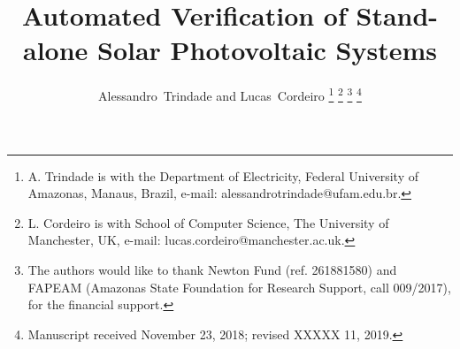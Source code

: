 \documentclass[journal]{IEEEtran}
\begin{document}
%
\title{Automated Verification of Stand-alone Solar Photovoltaic Systems}
%
%
%

\author{Alessandro~Trindade and Lucas~Cordeiro%
\thanks{A. Trindade is with the Department of Electricity, Federal University of Amazonas, Manaus, Brazil, e-mail: alessandrotrindade@ufam.edu.br.}%
\thanks{L. Cordeiro is with School of Computer Science, The University of Manchester, UK, e-mail: lucas.cordeiro@manchester.ac.uk.}%
\thanks{The authors would like to thank Newton Fund (ref. 261881580) and FAPEAM (Amazonas State Foundation for Research Support, call 009/2017), for the financial support.}
\thanks{Manuscript received November 23, 2018; revised XXXXX 11, 2019.}}

% 
%
\end{document}
